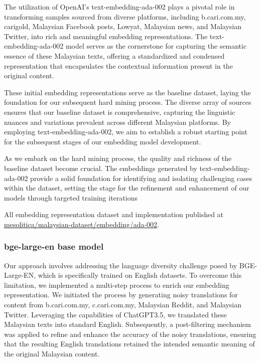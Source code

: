 \documentclass[preprint]{article}
\begin{document}
The utilization of OpenAI's text-embedding-ada-002 plays a pivotal role in transforming samples sourced from diverse platforms, including b.cari.com.my, carigold, Malaysian Facebook posts, Lowyat, Malaysian news, and Malaysian Twitter, into rich and meaningful embedding representations. The text-embedding-ada-002 model serves as the cornerstone for capturing the semantic essence of these Malaysian texts, offering a standardized and condensed representation that encapsulates the contextual information present in the original content.

These initial embedding representations serve as the baseline dataset, laying the foundation for our subsequent hard mining process. The diverse array of sources ensures that our baseline dataset is comprehensive, capturing the linguistic nuances and variations prevalent across different Malaysian platforms. By employing text-embedding-ada-002, we aim to establish a robust starting point for the subsequent stages of our embedding model development.

As we embark on the hard mining process, the quality and richness of the baseline dataset become crucial. The embeddings generated by text-embedding-ada-002 provide a solid foundation for identifying and isolating challenging cases within the dataset, setting the stage for the refinement and enhancement of our models through targeted training iterations

All embedding representation dataset and implementation published at \href{https://github.com/mesolitica/malaysian-dataset/tree/master/embedding/ada-002}{mesolitica/malaysian-dataset/embedding/ada-002}.

\subsubsection{bge-large-en base model}

Our approach involves addressing the language diversity challenge posed by BGE-Large-EN, which is specifically trained on English datasets. To overcome this limitation, we implemented a multi-step process to enrich our embedding representation. We initiated the process by generating noisy translations for content from b.cari.com.my, c.cari.com.my, Malaysian Reddit, and Malaysian Twitter. Leveraging the capabilities of ChatGPT3.5, we translated these Malaysian texts into standard English. Subsequently, a post-filtering mechanism was applied to refine and enhance the accuracy of the noisy translations, ensuring that the resulting English translations retained the intended semantic meaning of the original Malaysian content.
\end{document}
